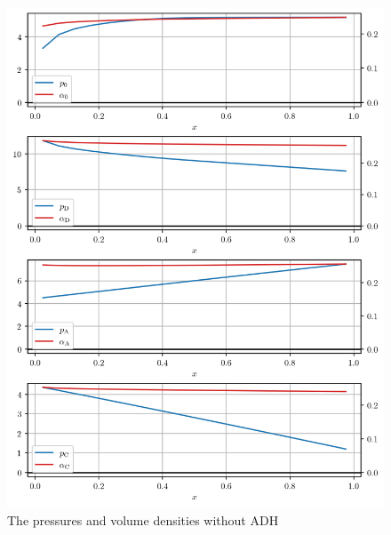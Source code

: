 \documentclass{article}
\begin{document}
\begin{figure}
    \centering
    \includegraphics[width=.9\textwidth]{../results/4-7-2023/noADH_p_alpha.png}
    \caption{The pressures and volume densities without ADH}
\end{figure}
\end{document}
